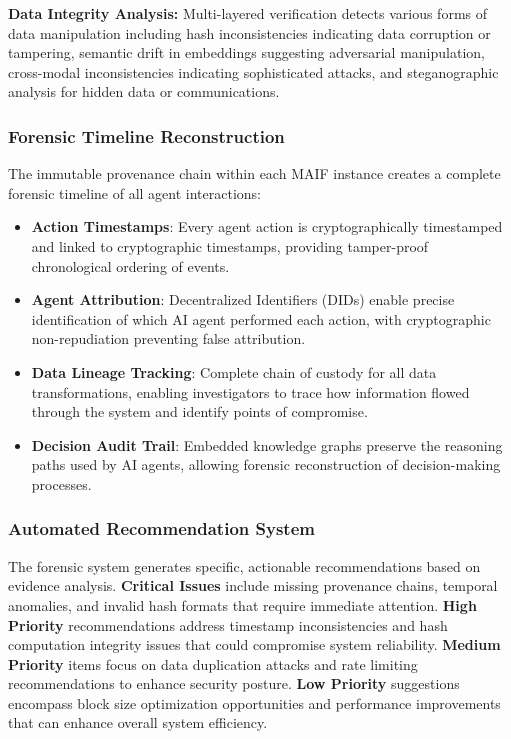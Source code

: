\documentclass[conference]{IEEEtran}
\begin{document}
\textbf{Data Integrity Analysis:} Multi-layered verification detects various forms of data manipulation including hash inconsistencies indicating data corruption or tampering, semantic drift in embeddings suggesting adversarial manipulation, cross-modal inconsistencies indicating sophisticated attacks, and steganographic analysis for hidden data or communications.

\subsubsection{Forensic Timeline Reconstruction}

The immutable provenance chain within each MAIF instance creates a complete forensic timeline of all agent interactions:

\begin{itemize}[leftmargin=*]
\item \textbf{Action Timestamps}: Every agent action is cryptographically timestamped and linked to cryptographic timestamps, providing tamper-proof chronological ordering of events.
\item \textbf{Agent Attribution}: Decentralized Identifiers (DIDs) enable precise identification of which AI agent performed each action, with cryptographic non-repudiation preventing false attribution.
\item \textbf{Data Lineage Tracking}: Complete chain of custody for all data transformations, enabling investigators to trace how information flowed through the system and identify points of compromise.
\item \textbf{Decision Audit Trail}: Embedded knowledge graphs preserve the reasoning paths used by AI agents, allowing forensic reconstruction of decision-making processes.
\end{itemize}

\subsubsection{Automated Recommendation System}

The forensic system generates specific, actionable recommendations based on evidence analysis. \textbf{Critical Issues} include missing provenance chains, temporal anomalies, and invalid hash formats that require immediate attention. \textbf{High Priority} recommendations address timestamp inconsistencies and hash computation integrity issues that could compromise system reliability. \textbf{Medium Priority} items focus on data duplication attacks and rate limiting recommendations to enhance security posture. \textbf{Low Priority} suggestions encompass block size optimization opportunities and performance improvements that can enhance overall system efficiency.
\end{document}
